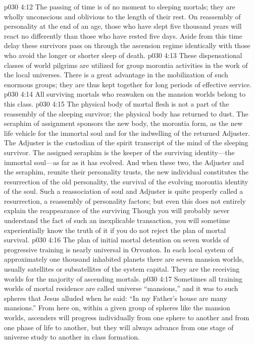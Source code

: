 \vs p030 4:12 The passing of time is of no moment to sleeping mortals; they are wholly unconscious and oblivious to the length of their rest. On reassembly of personality at the end of an age, those who have slept five thousand years will react no differently than those who have rested five days. Aside from this time delay these survivors pass on through the ascension regime identically with those who avoid the longer or shorter sleep of death.
\vs p030 4:13 These dispensational classes of world pilgrims are utilized for group morontia activities in the work of the local universes. There is a great advantage in the mobilization of such enormous groups; they are thus kept together for long periods of effective service.
\pc \vs p030 4:14 \bibnobreakspace {} All surviving mortals who reawaken on the mansion worlds belong to this class.
\vs p030 4:15 The physical body of mortal flesh is not a part of the reassembly of the sleeping survivor; the physical body has returned to dust. The seraphim of assignment sponsors the new body, the morontia form, as the new life vehicle for the immortal soul and for the indwelling of the returned Adjuster. The Adjuster is the custodian of the spirit transcript of the mind of the sleeping survivor. The assigned seraphim is the keeper of the surviving identity---the immortal soul---as far as it has evolved. And when these two, the Adjuster and the seraphim, reunite their personality trusts, the new individual constitutes the resurrection of the old personality, the survival of the evolving morontia identity of the soul. Such a reassociation of soul and Adjuster is quite properly called a resurrection, a reassembly of personality factors; but even this does not entirely explain the reappearance of the surviving  Though you will probably never understand the fact of such an inexplicable transaction, you will sometime experientially know the truth of it if you do not reject the plan of mortal survival.
\pc \vs p030 4:16 The plan of initial mortal detention on seven worlds of progressive training is nearly universal in Orvonton. In each local system of approximately one thousand inhabited planets there are seven mansion worlds, usually satellites or subsatellites of the system capital. They are the receiving worlds for the majority of ascending mortals.
\vs p030 4:17 Sometimes all training worlds of mortal residence are called universe “mansions,” and it was to such spheres that Jesus alluded when he said: “In my Father’s house are many mansions.” From here on, within a given group of spheres like the mansion worlds, ascenders will progress individually from one sphere to another and from one phase of life to another, but they will always advance from one stage of universe study to another in class formation.\plusone
